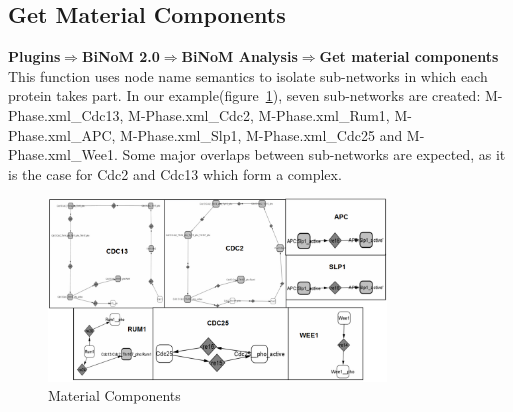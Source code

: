 \subsection{Get Material Components}
\textbf{Plugins$\Rightarrow$BiNoM 2.0$\Rightarrow$BiNoM Analysis$\Rightarrow$Get material components}\\
This function uses node name semantics to isolate sub-networks in which each protein takes part. In our example(figure~\ref{Material_Components}), seven sub-networks are created: M-Phase.xml\_Cdc13, M-Phase.xml\_Cdc2, M-Phase.xml\_Rum1, M-Phase.xml\_APC, M-Phase.xml\_Slp1, M-Phase.xml\_Cdc25 and M-Phase.xml\_Wee1. Some major overlaps between sub-networks are expected, as it is the case for Cdc2 and Cdc13 which form a complex.\\
\begin{figure}
\centering
\includegraphics[width=0.8\textwidth]{graphics/Material_components}
\caption{Material Components}
\label{Material_Components}
\end{figure}

